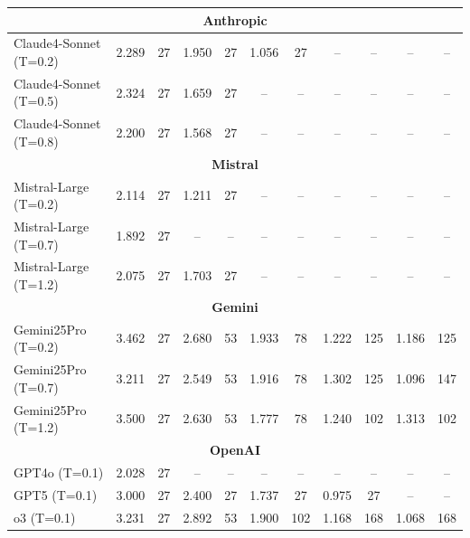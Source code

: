 \begin{table}
\begin{tabular}{|l|cc|cc|cc|cc|cc|}
\hline
\multicolumn{11}{|c|}{\textbf{Anthropic}} \\
\hline
Claude4-Sonnet (T=0.2) & 2.289 & 27 & 1.950 & 27 & 1.056 & 27 & -- & -- & -- & -- \\
Claude4-Sonnet (T=0.5) & 2.324 & 27 & 1.659 & 27 & -- & -- & -- & -- & -- & -- \\
Claude4-Sonnet (T=0.8) & 2.200 & 27 & 1.568 & 27 & -- & -- & -- & -- & -- & -- \\
\hline
\multicolumn{11}{|c|}{\textbf{Mistral}} \\
\hline
Mistral-Large (T=0.2) & 2.114 & 27 & 1.211 & 27 & -- & -- & -- & -- & -- & -- \\
Mistral-Large (T=0.7) & 1.892 & 27 & -- & -- & -- & -- & -- & -- & -- & -- \\
Mistral-Large (T=1.2) & 2.075 & 27 & 1.703 & 27 & -- & -- & -- & -- & -- & -- \\
\hline
\multicolumn{11}{|c|}{\textbf{Gemini}} \\
\hline
Gemini25Pro (T=0.2) & 3.462 & 27 & 2.680 & 53 & 1.933 & 78 & 1.222 & 125 & 1.186 & 125 \\
Gemini25Pro (T=0.7) & 3.211 & 27 & 2.549 & 53 & 1.916 & 78 & 1.302 & 125 & 1.096 & 147 \\
Gemini25Pro (T=1.2) & 3.500 & 27 & 2.630 & 53 & 1.777 & 78 & 1.240 & 102 & 1.313 & 102 \\
\hline
\multicolumn{11}{|c|}{\textbf{OpenAI}} \\
\hline
GPT4o (T=0.1) & 2.028 & 27 & -- & -- & -- & -- & -- & -- & -- & -- \\
GPT5 (T=0.1) & 3.000 & 27 & 2.400 & 27 & 1.737 & 27 & 0.975 & 27 & -- & -- \\
o3 (T=0.1) & 3.231 & 27 & 2.892 & 53 & 1.900 & 102 & 1.168 & 168 & 1.068 & 168 \\
\hline
\end{tabular}
\end{table}

\clearpage


